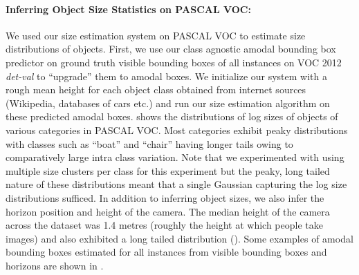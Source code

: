 \paragraph{Inferring Object Size Statistics on PASCAL VOC:} We used our size estimation system on PASCAL VOC to estimate size distributions of objects. First, we use our class agnostic amodal bounding box predictor on ground truth visible bounding boxes of all instances on VOC 2012 \textit{det-val} to ``upgrade'' them to amodal boxes. We initialize our system with a rough mean height for each object class obtained from internet sources (Wikipedia, databases of cars etc.) and run our size estimation algorithm on these predicted amodal boxes.  shows the distributions of log sizes of objects of various categories in PASCAL VOC. Most categories exhibit peaky distributions with classes such as ``boat'' and ``chair'' having longer tails owing to comparatively large intra class variation. Note that we experimented with using multiple size clusters per class for this experiment but the peaky, long tailed nature of these distributions meant that a single Gaussian capturing the log size distributions sufficed. In addition to inferring object sizes, we also infer the horizon position and height of the camera. The median height of the camera across the dataset was 1.4 metres (roughly the height at which people take images) and also exhibited a long tailed distribution (). Some examples of amodal bounding boxes estimated for all instances from visible bounding boxes and horizons are shown in .


